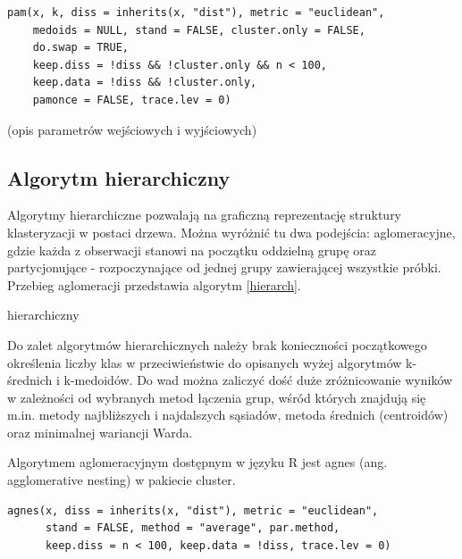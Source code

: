 \documentclass[11pt,a4paper,twoside]{article}
\begin{document}
\begin{verbatim}
pam(x, k, diss = inherits(x, "dist"), metric = "euclidean",
    medoids = NULL, stand = FALSE, cluster.only = FALSE,
    do.swap = TRUE,
    keep.diss = !diss && !cluster.only && n < 100,
    keep.data = !diss && !cluster.only,
    pamonce = FALSE, trace.lev = 0)
\end{verbatim} 

(opis parametrów wejściowych i wyjściowych)

\subsection{Algorytm hierarchiczny}
Algorytmy hierarchiczne pozwalają na graficzną reprezentację struktury klasteryzacji w postaci drzewa. Można wyróżnić tu dwa podejścia: aglomeracyjne, gdzie każda z obserwacji stanowi na początku oddzielną grupę oraz partycjonujące - rozpoczynające od jednej grupy zawierającej wszystkie próbki. Przebieg aglomeracji przedstawia algorytm \ref{hierarch}.

\begin{algorithm}[ht]
\caption{hierarchiczny}
\label{hierarch}
	\begin{algorithmic}
	\end{algorithmic}
\end{algorithm}

Do zalet algorytmów hierarchicznych należy brak konieczności początkowego określenia liczby klas w przeciwieństwie do opisanych wyżej algorytmów k-średnich i k-medoidów. Do wad można zaliczyć dość duże zróżnicowanie wyników w zależności od wybranych metod łączenia grup, wśród których znajdują się m.in. metody najbliższych i najdalszych sąsiadów, metoda średnich (centroidów) oraz minimalnej wariancji Warda.

Algorytmem aglomeracyjnym dostępnym w języku R jest agnes (ang. agglomerative nesting) w pakiecie cluster.

\begin{verbatim}
agnes(x, diss = inherits(x, "dist"), metric = "euclidean",
      stand = FALSE, method = "average", par.method,
      keep.diss = n < 100, keep.data = !diss, trace.lev = 0)
\end{verbatim} 
\end{document}
